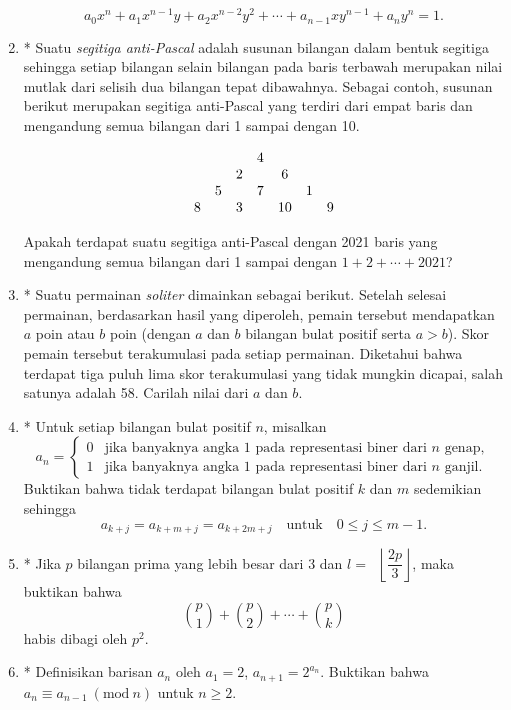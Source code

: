 \documentclass[12pt]{article}
\newcommand*\floor[1]{\mathop{}\!\left\lfloor{#1}\right\rfloor}
\newcommand{\Mod}[1]{\ (\mathrm{mod}\ #1)}
\begin{document}
\begin{enumerate}[leftmargin=*]
		\[ a_{0}x^{n} + a_{1}x^{n - 1}y + a_{2}x^{n - 2}y^{2} + \cdots + a_{n - 1}xy^{n - 1} + a_{n}y^{n} = 1. \]
		\item* Suatu \textit{segitiga anti-Pascal} adalah susunan bilangan dalam bentuk segitiga sehingga setiap bilangan selain bilangan pada baris terbawah merupakan nilai mutlak dari selisih dua bilangan tepat dibawahnya. Sebagai contoh, susunan berikut merupakan segitiga anti-Pascal yang terdiri dari empat baris dan mengandung semua bilangan dari 1 sampai dengan 10.
		\begin{center}
			\[
				\begin{array}{c c c c c c c c c}
					&&&&4&&&& \\
					&&&2&&6&&& \\
					&&5&&7&&1&& \\
					&8&&3&&10&&9&
				\end{array}
			\]
		\end{center}
		Apakah terdapat suatu segitiga anti-Pascal dengan 2021 baris yang mengandung semua bilangan dari 1 sampai dengan $ 1 + 2 + \cdots + 2021 $?
		\item* Suatu permainan \textit{soliter} dimainkan sebagai berikut. Setelah selesai permainan, berdasarkan hasil yang diperoleh, pemain tersebut mendapatkan $ a $ poin atau $ b $ poin (dengan $ a $ dan $ b $ bilangan bulat positif serta $ a > b $). Skor pemain tersebut terakumulasi pada setiap permainan. Diketahui bahwa terdapat tiga puluh lima skor terakumulasi yang tidak mungkin dicapai, salah satunya adalah 58. Carilah nilai dari $ a $ dan $ b $.
		\item* Untuk setiap bilangan bulat positif $ n $, misalkan
		\[
			a_{n} =	\begin{cases}
						0 & \mbox{jika banyaknya angka 1 pada representasi biner dari } n \mbox{ genap}, \\
						1 & \mbox{jika banyaknya angka 1 pada representasi biner dari } n \mbox{ ganjil}.
					\end{cases}
		\]
		Buktikan bahwa tidak terdapat bilangan bulat positif $ k $ dan $ m $ sedemikian sehingga
		\[ a_{k + j} = a_{k + m + j} = a_{k + 2m + j} \quad \mbox{untuk} \quad 0 \leq j \leq m - 1. \]
		\item* Jika $ p $ bilangan prima yang lebih besar dari 3 dan $ l = \floor{\dfrac{2p}{3}} $, maka buktikan bahwa
		\[ \binom{p}{1} + \binom{p}{2} + \cdots + \binom{p}{k} \]
		habis dibagi oleh $ p^{2} $.
		\item* Definisikan barisan $ a_{n} $ oleh $ a_{1} = 2 $, $ a_{n + 1} = 2^{a_{n}} $. Buktikan bahwa $ a_{n} \equiv a_{n - 1} \Mod{n} $ untuk $ n \geq 2 $.

\end{enumerate}
\end{document}
